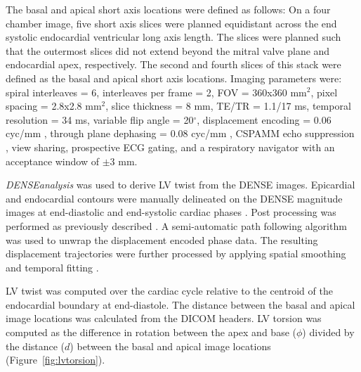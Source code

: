 	The basal and apical short axis locations were defined as follows: On a four chamber image, five short axis slices were planned equidistant across the end systolic endocardial ventricular long axis length. The slices were planned such that the outermost slices did not extend beyond the mitral valve plane and endocardial apex, respectively. The second and fourth slices of this stack were defined as the basal and apical short axis locations. Imaging parameters were: spiral interleaves = 6, interleaves per frame = 2, FOV = 360x360 mm$^2$, pixel spacing = 2.8x2.8 mm$^2$, slice thickness = 8 mm, TE/TR = 1.1/17 ms, temporal resolution = 34 ms, variable flip angle = 20$^{\circ}$, displacement encoding = 0.06 cyc/mm \cite{Wehner2015a}, through plane dephasing = 0.08 cyc/mm \cite{Zhong2006a}, CSPAMM echo suppression \cite{Kim2004}, view sharing, prospective ECG gating, and a respiratory navigator with an acceptance window of $\pm$3 mm.
	
	\textit{DENSEanalysis} \cite{Gilliam2016a} was used to derive LV twist from the DENSE images. Epicardial and endocardial contours were manually delineated on the DENSE magnitude images at end-diastolic and end-systolic cardiac phases \cite{Suever2014}. Post processing was performed as previously described \cite{Suever2014}. A semi-automatic path following algorithm was used to unwrap the displacement encoded phase data. The resulting displacement trajectories were further processed by applying spatial smoothing and temporal fitting \cite{Spottiswoode2007}.
	
	LV twist was computed over the cardiac cycle relative to the centroid of the endocardial boundary at end-diastole. The distance between the basal and apical image locations was calculated from the DICOM headers. LV torsion was computed as the difference in rotation between the apex and base ($\phi$) divided by the distance ($d$) between the basal and apical image locations \cite{Donekal2013a,Phan2009a,Sorger2003a} (Figure~\ref{fig:lvtorsion}).

